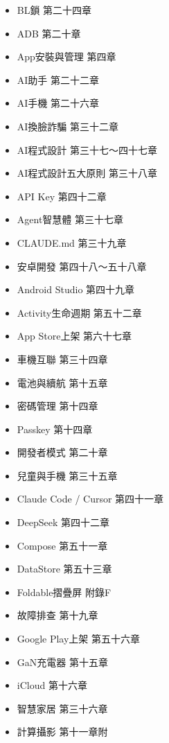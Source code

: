 


\begin{itemize}
  \item BL鎖 第二十四章
  \item ADB 第二十章
  \item App安裝與管理 第四章
  \item AI助手 第二十二章
  \item AI手機 第二十六章
  \item AI換臉詐騙 第三十二章
  \item AI程式設計 第三十七～四十七章
  \item AI程式設計五大原則 第三十八章
  \item API Key 第四十二章
  \item Agent智慧體 第三十七章
  \item CLAUDE.md 第三十九章
  \item 安卓開發 第四十八～五十八章
  \item Android Studio 第四十九章
  \item Activity生命週期 第五十二章
  \item App Store上架 第六十七章
\end{itemize}


\begin{itemize}
  \item 車機互聯 第三十四章
  \item 電池與續航 第十五章
  \item 密碼管理 第十四章
  \item Passkey 第十四章
  \item 開發者模式 第二十章
  \item 兒童與手機 第三十五章
  \item Claude Code / Cursor 第四十一章
  \item DeepSeek 第四十二章
  \item Compose 第五十一章
  \item DataStore 第五十三章
\end{itemize}


\begin{itemize}
  \item Foldable摺疊屏 附錄F
  \item 故障排查 第十九章
  \item Google Play上架 第五十六章
  \item GaN充電器 第十五章
  \item iCloud 第十六章
  \item 智慧家居 第三十六章
  \item 計算攝影 第十一章附
\end{itemize}

